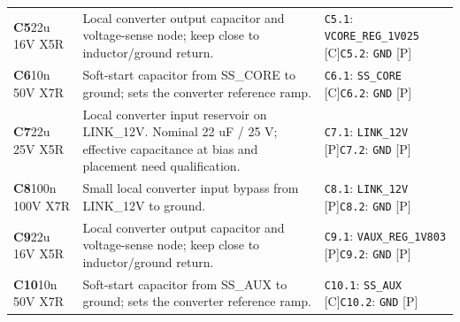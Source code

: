 \documentclass[11pt,a4paper]{article}
\begin{document}
\begin{longtable}{@{}P{27mm}P{83mm}P{58mm}@{}}
\textbf{C5}\newline 22u 16V X5R & Local converter output capacitor and voltage-sense node; keep close to inductor/ground return. & \nolinkurl{C5.1}: \nolinkurl{VCORE_REG_1V025} [C]\newline \nolinkurl{C5.2}: \nolinkurl{GND} [P] \\
\textbf{C6}\newline 10n 50V X7R & Soft-start capacitor from SS\_CORE to ground; sets the converter reference ramp. & \nolinkurl{C6.1}: \nolinkurl{SS_CORE} [C]\newline \nolinkurl{C6.2}: \nolinkurl{GND} [P] \\
\textbf{C7}\newline 22u 25V X5R & Local converter input reservoir on LINK\_12V. Nominal 22 uF / 25 V; effective capacitance at bias and placement need qualification. & \nolinkurl{C7.1}: \nolinkurl{LINK_12V} [P]\newline \nolinkurl{C7.2}: \nolinkurl{GND} [P] \\
\textbf{C8}\newline 100n 100V X7R & Small local converter input bypass from LINK\_12V to ground. & \nolinkurl{C8.1}: \nolinkurl{LINK_12V} [P]\newline \nolinkurl{C8.2}: \nolinkurl{GND} [P] \\
\textbf{C9}\newline 22u 16V X5R & Local converter output capacitor and voltage-sense node; keep close to inductor/ground return. & \nolinkurl{C9.1}: \nolinkurl{VAUX_REG_1V803} [P]\newline \nolinkurl{C9.2}: \nolinkurl{GND} [P] \\
\textbf{C10}\newline 10n 50V X7R & Soft-start capacitor from SS\_AUX to ground; sets the converter reference ramp. & \nolinkurl{C10.1}: \nolinkurl{SS_AUX} [C]\newline \nolinkurl{C10.2}: \nolinkurl{GND} [P] \\

\end{longtable}
\end{document}
